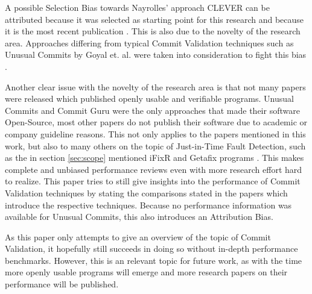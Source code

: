 A possible Selection Bias towards Nayrolles' approach CLEVER can be attributed because it was selected as starting point for this research and because it is the most recent publication \cite{Nayrolles2018}. This is also due to the novelty of the research area. Approaches differing from typical Commit Validation techniques such as Unusual Commits by Goyal et. al. were taken into consideration to fight this bias \cite{Goyal2017}.

Another clear issue with the novelty of the research area is that not many papers were released which published openly usable and verifiable programs. Unusual Commits and Commit Guru were the only approaches that made their software Open-Source, most other papers do not publish their software due to academic or company guideline reasons. This not only applies to the papers mentioned in this work, but also to many others on the topic of Just-in-Time Fault Detection, such as the in section \ref{sec:scope} mentioned iFixR and Getafix programs \cite{Koyuncu2019,Bader2019}. This makes complete and unbiased performance reviews even with more research effort hard to realize. This paper tries to still give insights into the performance of Commit Validation techniques by stating the comparisons stated in the papers which introduce the respective techniques. Because no performance information was available for Unusual Commits, this also introduces an Attribution Bias. 

As this paper only attempts to give an overview of the topic of Commit Validation, it hopefully still succeeds in doing so without in-depth performance benchmarks. However, this is an relevant topic for future work, as with the time more openly usable programs will emerge and more research papers on their performance will be published.





